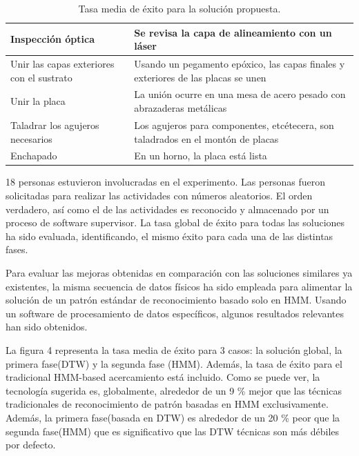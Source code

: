 \documentclass{article}
\begin{document}
\begin{table}[h]
\begin{center}
\begin{tabular}{ | p{4cm} | p{9cm} | }
			Inspección óptica                                  & Se revisa la capa de alineamiento con un láser                                                                           \\ \hline
			Unir las capas exteriores con el sustrato          & Usando un pegamento epóxico, las capas finales y exteriores de las placas se unen                                        \\ \hline
			Unir la placa                                      & La unión ocurre en una mesa de acero pesado con abrazaderas metálicas                                                    \\ \hline
			Taladrar los agujeros necesarios                   & Los agujeros para componentes, etcétecera, son taladrados en el montón de placas                                         \\ \hline
			Enchapado                                          & En un horno, la placa está lista                                                                                         \\ \hline
		\end{tabular}
	\end{center}
\caption{\label{fig:frog}Tasa media de éxito para la solución propuesta.}
\end{table}


18 personas estuvieron involucradas en el experimento. Las personas fueron solicitadas para realizar las actividades con números aleatorios. El orden verdadero, así como el de las actividades es reconocido y almacenado por un proceso de software supervisor. La tasa global de éxito para todas las soluciones ha sido evaluada, identificando, el mismo éxito para cada una de las distintas fases.

Para evaluar las mejoras obtenidas en comparación con las soluciones similares ya existentes, la misma secuencia de datos físicos ha sido empleada para alimentar la solución de un patrón estándar de reconocimiento basado solo en HMM. Usando un software de procesamiento de datos específicos, algunos resultados relevantes han sido obtenidos.

La figura 4 representa la tasa media de éxito para 3 casos: la solución global, la primera fase(DTW) y la segunda fase (HMM). Además, la tasa de éxito para el tradicional HMM-based acercamiento está incluido. Como se puede ver, la tecnología sugerida es, globalmente, alrededor de un 9 \% mejor que  las técnicas tradicionales de reconocimiento de patrón basadas en HMM exclusivamente. Además, la primera fase(basada en DTW) es alrededor de un 20 \% peor que la segunda fase(HMM) que es significativo que las DTW técnicas son más débiles por defecto.
\end{document}
